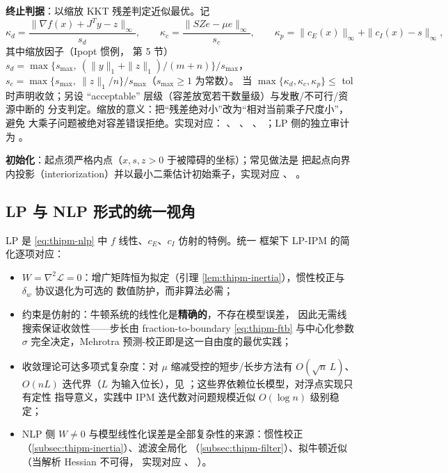 \textbf{终止判据}：以缩放 KKT 残差判定近似最优。记
\begin{equation}\label{eq:thipm-scaled-residual}
  \kappa_d=\frac{\|\nabla f(x)+J^{T}y-z\|_\infty}{s_d},
  \qquad
  \kappa_c=\frac{\|SZe-\mu e\|_\infty}{s_c},
  \qquad
  \kappa_p=\|c_E(x)\|_\infty+\|c_I(x)-s\|_\infty ,
\end{equation}
其中缩放因子（Ipopt 惯例，\cite{ipmwachter2006} 第 5 节）
$s_d=\max\{s_{\max},\ (\|y\|_1+\|z\|_1)/(m+n)\}/s_{\max}$，
$s_c=\max\{s_{\max},\ \|z\|_1/n\}/s_{\max}$（$s_{\max}\ge1$ 为常数）。
当 $\max\{\kappa_d,\kappa_c,\kappa_p\}\le$ tol 时声明收敛；另设
``acceptable'' 层级（容差放宽若干数量级）与发散/不可行/资源中断的
分支判定。缩放的意义：把``残差绝对小''改为``相对当前乘子尺度小''，避免
大乘子问题被绝对容差错误拒绝。实现对应：
、
、
、
；LP 侧的独立审计为
。

\textbf{初始化}：起点须严格内点（$x,s,z>0$ 于被障碍的坐标）；常见做法是
把起点向界内投影（interiorization）并以最小二乘估计初始乘子，实现对应
、
。

\subsection{LP 与 NLP 形式的统一视角}\label{subsec:thipm-unify}

LP 是 \eqref{eq:thipm-nlp} 中 $f$ 线性、$c_E$、$c_I$ 仿射的特例。统一
框架下 LP-IPM 的简化逐项对应：

\begin{itemize}
  \item $W=\nabla^{2}\mathcal{L}=0$：增广矩阵恒为拟定（引理
        \ref{lem:thipm-inertia}），惯性校正与 $\delta_w$ 协议退化为可选的
        数值防护，而非算法必需；
  \item 约束是仿射的：牛顿系统的线性化是\textbf{精确的}，不存在模型误差，
        因此无需线搜索保证收敛性——步长由 fraction-to-boundary
        \eqref{eq:thipm-ftb} 与中心化参数 $\sigma$ 完全决定，Mehrotra
        预测-校正即是这一自由度的最优实践；
  \item 收敛理论可达多项式复杂度：对 $\mu$ 缩减受控的短步/长步方法有
        $O(\sqrt{n}\,L)$、$O(nL)$ 迭代界（$L$ 为输入位长），见
        \cite{ipmwright1997}；这些界依赖位长模型，对浮点实现只有定性
        指导意义，实践中 IPM 迭代数对问题规模近似 $O(\log n)$ 级别稳定；
  \item NLP 侧 $W\ne0$ 与模型线性化误差是全部复杂性的来源：惯性校正
        （\ref{subsec:thipm-inertia}）、滤波全局化
        （\ref{subsec:thipm-filter}）、拟牛顿近似（当解析 Hessian 不可得，
        实现对应 、
        ）。
\end{itemize}

